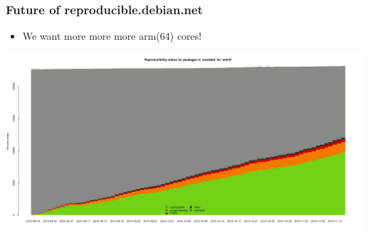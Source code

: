 \documentclass[14pt]{beamer}
\begin{document}
\begin{frame}
 \frametitle{Future of reproducible.debian.net}

 \begin{itemize}
 \item We want more more more arm(64) cores!
 \end{itemize}
 \begin{center}
  \includegraphics[height=0.73\paperheight]{images/stats_pkg_state_armhf.png}
  \vfill
 \end{center}
\end{frame}
\end{document}
